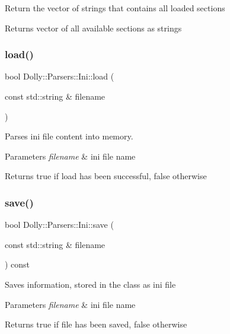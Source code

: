 Return the vector of strings that contains all loaded sections \begin{DoxyReturn}{Returns}
vector of all available sections as strings 
\end{DoxyReturn}
\mbox{\label{class_dolly_1_1_parsers_1_1_ini_ad8315b663c209a05664b2b0d4df4fcb7}} 
\subsubsection{\texorpdfstring{load()}{load()}}
{\footnotesize\ttfamily bool Dolly\+::\+Parsers\+::\+Ini\+::load (\begin{DoxyParamCaption}\item[{const std\+::string \&}]{filename }\end{DoxyParamCaption})}

Parses ini file content into memory. 
\begin{DoxyParams}{Parameters}
{\em filename} & ini file name \\
\hline
\end{DoxyParams}
\begin{DoxyReturn}{Returns}
true if load has been successful, false otherwise 
\end{DoxyReturn}
\mbox{\label{class_dolly_1_1_parsers_1_1_ini_a706c4dcbe74e09cb12c224d32c53afc1}} 
\subsubsection{\texorpdfstring{save()}{save()}}
{\footnotesize\ttfamily bool Dolly\+::\+Parsers\+::\+Ini\+::save (\begin{DoxyParamCaption}\item[{const std\+::string \&}]{filename }\end{DoxyParamCaption}) const}

Saves information, stored in the class as ini file 
\begin{DoxyParams}{Parameters}
{\em filename} & ini file name \\
\hline
\end{DoxyParams}
\begin{DoxyReturn}{Returns}
true if file has been saved, false otherwise 
\end{DoxyReturn}
\mbox{\label{class_dolly_1_1_parsers_1_1_ini_a86d11b952d38230e35b2b1a3c032aa4f}} 
